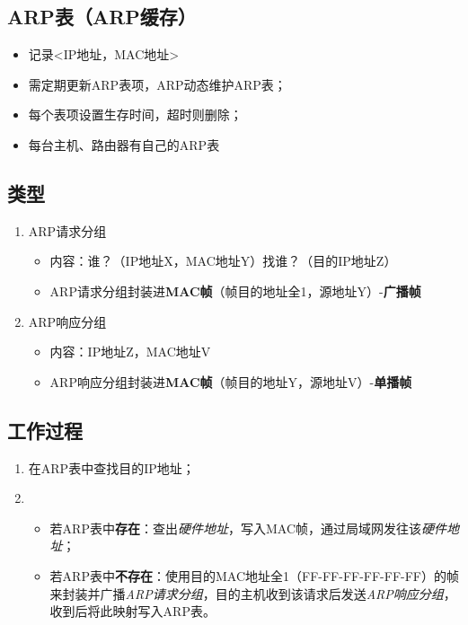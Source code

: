 \subsection{ARP表（ARP缓存）}
\begin{itemize}
    \item 记录<IP地址，MAC地址>
    \item 需定期更新ARP表项，ARP动态维护ARP表；
    \item 每个表项设置生存时间，超时则删除；
    \item 每台主机、路由器有自己的ARP表
\end{itemize}


\subsection{类型}
\begin{enumerate}
    \item ARP请求分组\begin{itemize}
        \item 内容：谁？（IP地址X，MAC地址Y）找谁？（目的IP地址Z）
        \item ARP请求分组封装进\textbf{MAC帧}（帧目的地址全1，源地址Y）-\textbf{广播帧}
    \end{itemize}
    \item ARP响应分组\begin{itemize}
        \item 内容：IP地址Z，MAC地址V
        \item ARP响应分组封装进\textbf{MAC帧}（帧目的地址Y，源地址V）-\textbf{单播帧}
    \end{itemize}
\end{enumerate}


\subsection{工作过程}
\begin{enumerate}
    \item 在ARP表中查找目的IP地址；
    \item \begin{itemize}
        \item 若ARP表中\textbf{存在}：查出\textit{硬件地址}，写入MAC帧，通过局域网发往该\textit{硬件地址}；
        \item 若ARP表中\textbf{不存在}：使用目的MAC地址全1（FF-FF-FF-FF-FF-FF）的帧来封装并广播\textit{ARP请求分组}，目的主机收到该请求后发送\textit{ARP响应分组}，收到后将此映射写入ARP表。
    \end{itemize}
\end{enumerate}



